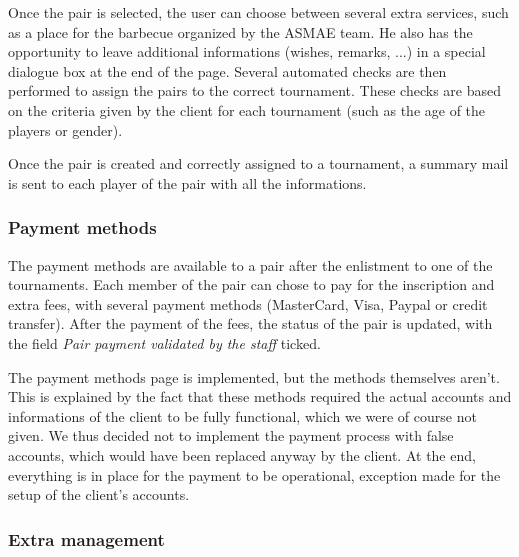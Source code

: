 Once the pair is selected, the user can choose between several extra services, such as a place for the barbecue organized by the ASMAE team. He also has the opportunity to leave additional informations (wishes, remarks, ...) in a special dialogue box at the end of the page. Several automated checks are then performed to assign the pairs to the correct tournament. These checks are based on the criteria given by the client for each tournament (such as the age of the players or gender). \newline

Once the pair is created and correctly assigned to a tournament, a summary mail is sent to each player of the pair with all the informations.


\subsubsection{Payment methods}
\label{subs:Payment methods}


The payment methods are available to a pair after the enlistment to one of the tournaments. Each member of the pair can chose to pay for the inscription and extra fees, with several payment methods (MasterCard, Visa, Paypal or credit transfer). After the payment of the fees, the status of the pair is updated, with the field \textit{Pair payment validated by the staff} ticked.\newline

The payment methods page is implemented, but the methods themselves aren't. This is explained by the fact that these methods required the actual accounts and informations of the client to be fully functional, which we were of course not given. We thus decided not to implement the payment process with false accounts, which would have been replaced anyway by the client. At the end, everything is in place for the payment to be operational, exception made for the setup of the client's accounts.

\subsubsection{Extra management}
\label{subs:Extra management}

